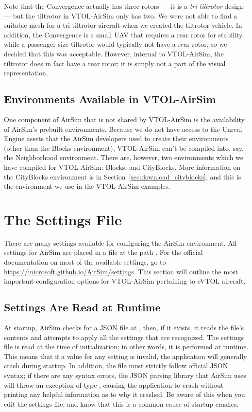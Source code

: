 Note that the Convergence actually has three rotors --- it is a \textit{tri-tiltrotor} design --- but the tiltrotor in VTOL-AirSim only has two. We were not able to find a suitable mesh for a tri-tiltrotor aircraft when we created the tiltrotor vehicle. In addition, the Convergence is a small UAV that requires a rear rotor for stability, while a passenger-size tiltrotor would typically not have a rear rotor, so we decided that this was acceptable. However, internal to VTOL-AirSim, the tiltrotor does in fact have a rear rotor; it is simply not a part of the visual representation.


\subsection{Environments Available in VTOL-AirSim}
One component of AirSim that is not shared by VTOL-AirSim is the availability of AirSim's prebuilt environments. Because we do not have access to the Unreal Engine assets that the AirSim developers used to create their environments (other than the Blocks environment), VTOL-AirSim can't be compiled into, say, the Neighborhood environment. There are, however, two environments which we have compiled for VTOL-AirSim: Blocks, and CityBlocks. More information on the CityBlocks environment is in Section~\ref{sec:download_cityblocks}, and this is the environment we use in the VTOL-AirSim examples.

\section{The Settings File}\label{sec:settings_file}

There are many settings available for configuring the AirSim environment. All settings for AirSim are placed in a  file at the path . For the official documentation on most of the available settings, go to \url{https://microsoft.github.io/AirSim/settings}. This section will outline the most important configuration options for VTOL-AirSim pertaining to eVTOL aircraft.

\subsection{Settings Are Read at Runtime}
At startup, AirSim checks for a JSON file at , then, if it exists, it reads the file's contents and attempts to apply all the settings that are recognized. The settings file is read at the time of initialization; in other words, it is performed at runtime. This means that if a value for any setting is invalid, the application will generally crash during startup. In addition, the file must strictly follow official JSON syntax; if there are any syntax errors, the JSON parsing library that AirSim uses will throw an exception of type , causing the application to crash without printing any helpful information as to why it crashed. Be aware of this when you edit the settings file, and know that this is a common cause of startup crashes.

